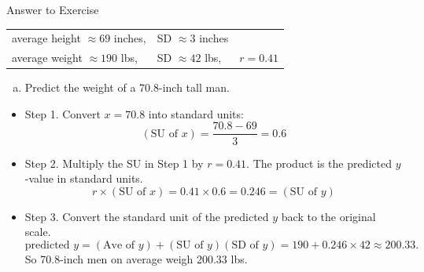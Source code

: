 \documentclass[
  ignorenonframetext,
]{beamer}
\providecommand{\tightlist}{%
  \setlength{\itemsep}{0pt}\setlength{\parskip}{0pt}}
\begin{document}
\begin{frame}{Answer to Exercise}
\protect\hypertarget{answer-to-exercise}{}
\begin{center}
\begin{tabular}{lll}
average height $\approx 69$ inches,  & SD $\approx 3$ inches \\
average weight $\approx 190$ lbs, & SD $\approx 42$ lbs, & $r= 0.41$\\
\end{tabular}
\end{center}

\vspace{-12pt}

\begin{enumerate}
[a.]
\tightlist
\item
  Predict the weight of a 70.8-inch tall man.
\end{enumerate}

\small

\begin{itemize}
\tightlist
\item
  Step 1. Convert \(x=70.8\) into standard units:
  \[(\text{SU of }x) =\dfrac{70.8-69}{3}=0.6\]
\item
  Step 2. Multiply the SU in Step 1 by \(r=0.41\). The product is the
  predicted \(y\)-value in standard units.
  \[r\times (\text{SU of }x) =0.41\times0.6=0.246=(\text{SU of }y)\]
\item
  Step 3. Convert the standard unit of the predicted \(y\) back to the
  original scale.
  \[ \text{predicted }y=(\text{Ave of }y)+ (\text{SU of }y)(\text{SD of }y)=190+0.246\times 42\approx 200.33.\]
  So 70.8-inch men on average weigh 200.33 lbs.
\end{itemize}
\end{frame}
\end{document}
